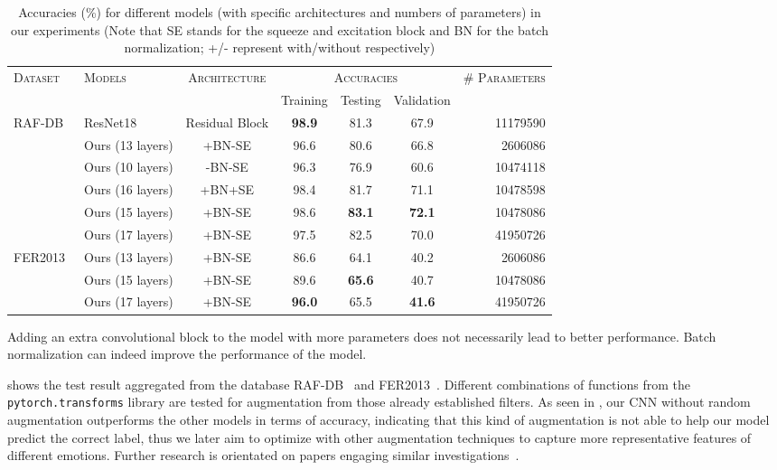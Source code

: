 \begin{table}[ht]
  \centering
  \begin{tabular}{@{}llccccr@{}}
    \toprule 
    \multirow{2}{*}{\textsc{Dataset}}&\multirow{2}{*}{\textsc{Models}}&\multirow{2}{*}{\textsc{Architecture}} & \multicolumn{3}{c}{\textsc{Accuracies}} & \multirow{2}{*}{\textsc{\# Parameters}} \\
    \cline{4-6}
    &&& Training & Testing & Validation  &  \\
    \midrule
    \multirow{6}{*}{RAF-DB~\cite{li_reliable_2017,li2019reliable}}     & ResNet18~\cite{HeZRS16} & Residual Block  & \textbf{98.9} & 81.3 & 67.9 & 11179590 \\
    &Ours (13 layers) & +BN-SE & 96.6 & 80.6 & 66.8 & 2606086 \\ 
    &Ours (10 layers) & -BN-SE & 96.3 & 76.9 & 60.6 & 10474118 \\
    &Ours (16 layers) & +BN+SE & 98.4 & 81.7 & 71.1 & 10478598 \\
    &Ours (15 layers) & +BN-SE & 98.6 & \textbf{83.1} & \textbf{72.1} & 10478086 \\
    &Ours (17 layers) & +BN-SE & 97.5 & 82.5 & 70.0 & 41950726 \\ 
    \midrule
    \multirow{3}{*}{FER2013~\cite{BarsoumZCZ16}} & Ours (13 layers) & +BN-SE & 86.6 & 64.1 & 40.2 & 2606086 \\
    &Ours (15 layers) & +BN-SE & 89.6 & \textbf{65.6} & 40.7 & 10478086 \\
    &Ours (17 layers) & +BN-SE & \textbf{96.0} & 65.5 & \textbf{41.6} & 41950726 \\
    \bottomrule
  \end{tabular}
  \caption{Accuracies (\%) for different models (with specific architectures and numbers of parameters) in our experiments 
  (Note that SE stands for the squeeze and excitation block and BN for the batch normalization; 
  +/- represent with/without respectively)}
  \label{tab:model}
\end{table}

Adding an extra convolutional block to the model with more parameters does not necessarily lead to better performance.
Batch normalization can indeed improve the performance of the model. 

 shows the test result aggregated from the database RAF-DB~\cite{kaggle_rafdb} and FER2013~\cite{kaggle_fer}.
Different combinations of functions from the \texttt{pytorch.transforms} library are tested for augmentation from those already established filters. %
As seen in , 
our CNN without random augmentation outperforms the other models in terms of accuracy, 
indicating that this kind of augmentation is not able to help our model predict the correct label, 
thus we later aim to optimize with other augmentation techniques to capture more representative features of different emotions.
Further research is orientated on papers engaging similar investigations~\cite{ZeilerF14,li_reliable_2017,VermaMRMV23}.


